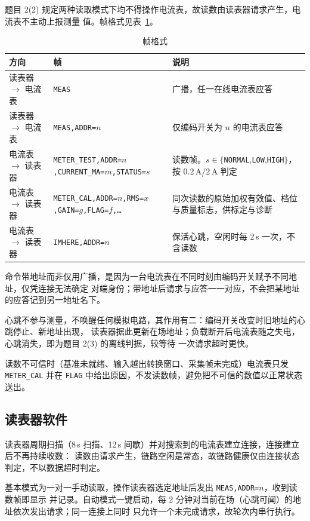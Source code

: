 \documentclass[12pt]{article}
\newcommand{\wuhao}{\fontsize{10.5pt}{15pt}\selectfont}
\begin{document}
题目 2(2) 规定两种读取模式下均不得操作电流表，故读数由读表器请求产生，电流表不主动上报测量
值。帧格式见表~\ref{tab:frame}。

\begin{table}[htbp]\centering
\caption{帧格式}
\label{tab:frame}
\wuhao
\begin{tabular}{llp{6.2cm}}
\toprule
方向 & 帧 & 说明\\
\midrule
读表器 $\to$ 电流表 & \texttt{MEAS} & 广播，任一在线电流表应答\\
读表器 $\to$ 电流表 & \texttt{MEAS,ADDR=$n$} & 仅编码开关为 $n$ 的电流表应答\\
电流表 $\to$ 读表器 & \texttt{METER\_TEST,ADDR=$n$,CURRENT\_MA=$m$,STATUS=$s$}
  & 读数帧。$s\in\{$\texttt{NORMAL},\texttt{LOW},\texttt{HIGH}$\}$，按 0.2\,A/2\,A 判定\\
电流表 $\to$ 读表器 & \texttt{METER\_CAL,ADDR=$n$,RMS=$x$,GAIN=$g$,FLAG=$f$,\dots}
  & 同次读数的原始加权有效值、档位与质量标志，供标定与诊断\\
电流表 $\to$ 读表器 & \texttt{IMHERE,ADDR=$n$} & 保活心跳，空闲时每 2\,s 一次，不含读数\\
\bottomrule
\end{tabular}
\end{table}

命令带地址而非仅用广播，是因为一台电流表在不同时刻由编码开关赋予不同地址，仅凭连接无法确定
对端身份；带地址后请求与应答一一对应，不会把某地址的应答记到另一地址名下。

心跳不参与测量，不唤醒任何模拟电路，其作用有二：编码开关改变时旧地址的心跳停止、新地址出现，
读表器据此更新在场地址；负载断开后电流表随之失电，心跳消失，即为题目 2(3) 的离线判据，较等待
一次请求超时更快。

读数不可信时（基准未就绪、输入越出转换窗口、采集帧未完成）电流表只发 \texttt{METER\_CAL} 并在
\texttt{FLAG} 中给出原因，不发读数帧，避免把不可信的数值以正常状态送出。

\subsection{读表器软件}
读表器周期扫描（8\,s 扫描、12\,s 间歇）并对搜索到的电流表建立连接，连接建立后不再持续收数：
读数由请求产生，链路空闲是常态，故链路健康仅由连接状态判定，不以数据超时判定。

基本模式为一对一手动读取，操作读表器选定地址后发出 \texttt{MEAS,ADDR=$n$}，收到读数帧即显示
并记录。自动模式一键启动，每 2 分钟对当前在场（心跳可闻）的地址依次发出请求；同一连接上同时
只允许一个未完成请求，故轮次内串行执行。
\end{document}
